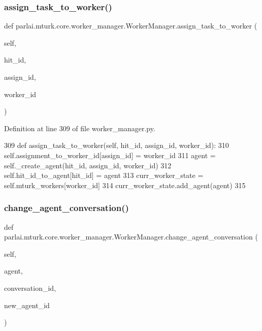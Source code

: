 \subsubsection{\texorpdfstring{assign\+\_\+task\+\_\+to\+\_\+worker()}{assign\_task\_to\_worker()}}
{\footnotesize\ttfamily def parlai.\+mturk.\+core.\+worker\+\_\+manager.\+Worker\+Manager.\+assign\+\_\+task\+\_\+to\+\_\+worker (\begin{DoxyParamCaption}\item[{}]{self,  }\item[{}]{hit\+\_\+id,  }\item[{}]{assign\+\_\+id,  }\item[{}]{worker\+\_\+id }\end{DoxyParamCaption})}



Definition at line 309 of file worker\+\_\+manager.\+py.


\begin{DoxyCode}
309     \textcolor{keyword}{def }assign\_task\_to\_worker(self, hit\_id, assign\_id, worker\_id):
310         self.assignment\_to\_worker\_id[assign\_id] = worker\_id
311         agent = self.\_create\_agent(hit\_id, assign\_id, worker\_id)
312         self.hit\_id\_to\_agent[hit\_id] = agent
313         curr\_worker\_state = self.mturk\_workers[worker\_id]
314         curr\_worker\_state.add\_agent(agent)
315 
\end{DoxyCode}
\mbox{\label{classparlai_1_1mturk_1_1core_1_1worker__manager_1_1WorkerManager_aa140d322d7237605580f5162a437e0ba}} 
\subsubsection{\texorpdfstring{change\+\_\+agent\+\_\+conversation()}{change\_agent\_conversation()}}
{\footnotesize\ttfamily def parlai.\+mturk.\+core.\+worker\+\_\+manager.\+Worker\+Manager.\+change\+\_\+agent\+\_\+conversation (\begin{DoxyParamCaption}\item[{}]{self,  }\item[{}]{agent,  }\item[{}]{conversation\+\_\+id,  }\item[{}]{new\+\_\+agent\+\_\+id }\end{DoxyParamCaption})}

